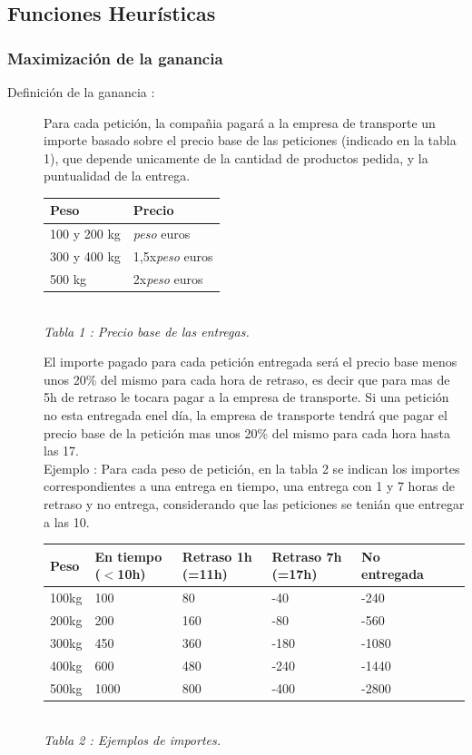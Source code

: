 \documentclass{article}
\begin{document}
\subsection{Funciones Heurísticas}
\subsubsection{Maximización de la ganancia}
\begin{description}
\item[Definición de la ganancia :]
Para cada petición, la compañia pagará a la empresa de transporte un importe
basado sobre el precio base de las peticiones (indicado en la tabla 1), que
depende unicamente de la cantidad de productos pedida, y la puntualidad de la 
entrega.\\
\begin{center}
\begin{tabular}{|l|l|}
\hline
Peso & Precio\\
\hline
100 y 200 kg & {\it peso} euros\\
300 y 400 kg & 1,5x{\it peso} euros\\
500 kg & 2x{\it peso} euros\\
\hline
\end{tabular}\\
{\it Tabla 1 : Precio base de las entregas.} \end{center}
El importe pagado para cada petición entregada será el precio base menos unos
20\% del mismo para cada hora de retraso, es decir que para mas de 5h de retraso
le tocara pagar a la empresa de transporte. Si una petición no esta entregada enel día, la empresa de transporte tendrá que pagar el precio base de la petición
mas unos 20\% del mismo para cada hora hasta las 17.\\

Ejemplo : Para cada peso de petición, en la tabla 2 se indican los
importes correspondientes a una entrega en tiempo, una entrega con 1 y 7 horas
de retraso y no entrega, considerando que las peticiones se tenián que entregar
a las 10.
\begin{center}
\begin{tabular}{|l|l|l|l|l|l|l|}
\hline
Peso & En tiempo ($<$10h) & Retraso 1h (=11h) & Retraso 7h (=17h) &
No entregada\\
\hline
100kg & 100 & 80 & -40 & -240\\
200kg & 200 & 160 & -80 & -560\\
300kg & 450 & 360 & -180 & -1080\\
400kg & 600 & 480 & -240 & -1440\\
500kg & 1000 & 800 & -400 & -2800\\
\hline
\end{tabular}\\
{\it Tabla 2 : Ejemplos de importes.} \end{center}
\end{description}
\end{document}
